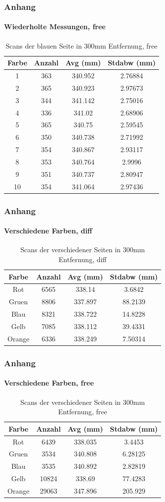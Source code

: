 \documentclass[xcolor=dvipsnames]{beamer}
\begin{document}
\begin{frame}[noframenumbering]
	\frametitle{Anhang}
	\framesubtitle{Wiederholte Messungen, free}
	\begin{table}
		\begin{tabular}{c|c|c|c}
			Farbe & Anzahl & Avg (mm) & Stdabw (mm) \\
			\hline
			1 & 363 & 340.952 & 2.76884 \\
			2 & 365 & 340.923 & 2.97673 \\
			3 & 344 & 341.142 & 2.75016 \\
			4 & 336 & 341.02 & 2.68906 \\
			5 & 365 & 340.75 & 2.59545 \\
			6 & 350 & 340.738 & 2.71992 \\
			7 & 354 & 340.867 & 2.93117 \\
			8 & 353 & 340.764 & 2.9996 \\
			9 & 351 & 340.737 & 2.80947 \\
			10 & 354 & 341.064 & 2.97436 \\
		\end{tabular}
		\caption{Scans der blauen Seite in 300mm Entfernung, free}
	\end{table}
\end{frame}


\begin{frame}[noframenumbering]
	\frametitle{Anhang}
	\framesubtitle{Verschiedene Farben, diff}
	\begin{table}
		\begin{tabular}{c|c|c|c}
			Farbe & Anzahl & Avg (mm) & Stdabw (mm) \\
			\hline
			Rot & 6565 & 338.14 & 3.6842 \\
			Gruen & 8806 & 337.897 & 88.2139 \\
			Blau & 8321 & 338.722 & 14.8228 \\
			Gelb & 7085 & 338.112 & 39.4331 \\
			Orange & 6336 & 338.249 & 7.50314 \\
		\end{tabular}
		\caption{Scans der verschiedener Seiten in 300mm Entfernung, diff}
	\end{table}
\end{frame}


\begin{frame}[noframenumbering]
	\frametitle{Anhang}
	\framesubtitle{Verschiedene Farben, free}
	\begin{table}
		\begin{tabular}{c|c|c|c}
			Farbe & Anzahl & Avg (mm) & Stdabw (mm) \\
			\hline
			Rot & 6439 & 338.035 & 3.4453 \\
			Gruen & 3534 & 340.808 & 6.28125 \\
			Blau & 3535 & 340.892 & 2.82819 \\
			Gelb & 10824 & 338.69 & 77.4283 \\
			Orange & 29063 & 347.896 & 205.929 \\
		\end{tabular}
		\caption{Scans der verschiedener Seiten in 300mm Entfernung, free}
	\end{table}
\end{frame}
\end{document}
